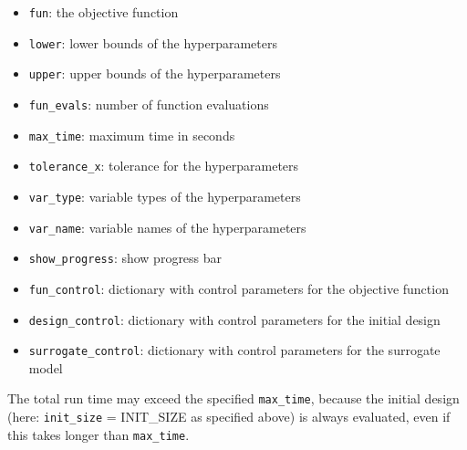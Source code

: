 \documentclass[
  letterpaper,
  DIV=11,
  numbers=noendperiod]{scrreprt}
\providecommand{\tightlist}{%
  \setlength{\itemsep}{0pt}\setlength{\parskip}{0pt}}\usepackage{longtable,booktabs,array}
\begin{document}
\begin{itemize}
\tightlist
\item
  \texttt{fun}: the objective function
\item
  \texttt{lower}: lower bounds of the hyperparameters
\item
  \texttt{upper}: upper bounds of the hyperparameters
\item
  \texttt{fun\_evals}: number of function evaluations
\item
  \texttt{max\_time}: maximum time in seconds
\item
  \texttt{tolerance\_x}: tolerance for the hyperparameters
\item
  \texttt{var\_type}: variable types of the hyperparameters
\item
  \texttt{var\_name}: variable names of the hyperparameters
\item
  \texttt{show\_progress}: show progress bar
\item
  \texttt{fun\_control}: dictionary with control parameters for the
  objective function
\item
  \texttt{design\_control}: dictionary with control parameters for the
  initial design
\item
  \texttt{surrogate\_control}: dictionary with control parameters for
  the surrogate model
\end{itemize}

\begin{tcolorbox}[enhanced jigsaw, rightrule=.15mm, opacityback=0, colframe=quarto-callout-note-color-frame, opacitybacktitle=0.6, toptitle=1mm, arc=.35mm, colbacktitle=quarto-callout-note-color!10!white, coltitle=black, toprule=.15mm, leftrule=.75mm, titlerule=0mm, title=\textcolor{quarto-callout-note-color}{\faInfo}\hspace{0.5em}{Note: Total run time}, bottomrule=.15mm, breakable, bottomtitle=1mm, left=2mm, colback=white]

The total run time may exceed the specified \texttt{max\_time}, because
the initial design (here: \texttt{init\_size} = INIT\_SIZE as specified
above) is always evaluated, even if this takes longer than
\texttt{max\_time}.

\end{tcolorbox}
\end{document}
